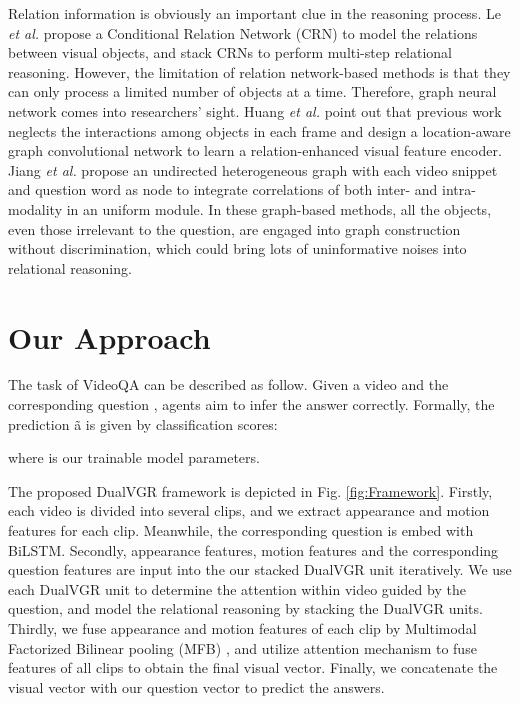 \documentclass[journal]{IEEEtran}
\begin{document}
Relation information is obviously an important clue in the reasoning process. Le \textit{et al.} \cite{le2020hierarchical} propose a Conditional Relation Network (CRN) to model the relations between visual objects, and stack CRNs to perform multi-step relational reasoning. However, the limitation of relation network-based methods is that they can only process a limited number of objects at a time. Therefore, graph neural network comes into researchers' sight. Huang \textit{et al.} \cite{huang2020location} point out that previous work neglects the interactions among objects in each frame and design a location-aware graph convolutional network to learn a relation-enhanced visual feature encoder. Jiang \textit{et al.} \cite{jiang2020reasoning} propose an undirected heterogeneous graph with each video snippet and question word as node to integrate correlations of both inter- and intra-modality in an uniform module. In these graph-based methods, all the objects, even those irrelevant to the question, are engaged into graph construction without discrimination, which could bring lots of uninformative noises into relational reasoning.  

\section{Our Approach}
The task of VideoQA can be described as follow. Given a video  and the corresponding question , agents aim to infer the answer  correctly. Formally, the prediction \~{a} is given by classification scores:

where  is our trainable model parameters. 

The proposed DualVGR framework is depicted in Fig. \ref{fig:Framework}. Firstly, each video is divided into several clips, and we extract appearance and motion features for each clip. Meanwhile, the corresponding question is embed with BiLSTM. Secondly, appearance features, motion features and the corresponding question features are input into the our stacked DualVGR unit iteratively. We use each DualVGR unit to determine the attention within video guided by the question, and model the relational reasoning by stacking the DualVGR units. Thirdly, we fuse appearance and motion features of each clip by Multimodal Factorized Bilinear pooling (MFB) \cite{yu2017multi}, and utilize attention mechanism to fuse features of all clips to obtain the final visual vector. Finally, we concatenate the visual vector with our question vector to predict the answers.
\end{document}
